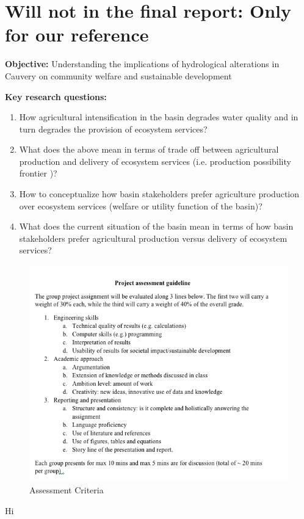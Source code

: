 \section{Will not in the final report: Only for our reference}

\textbf{Objective:} Understanding the implications of hydrological alterations in Cauvery on community welfare and sustainable development

\textbf{Key research questions: }
\begin{enumerate}
    \item How agricultural intensification in the basin degrades water quality and in turn degrades  the provision of ecosystem services?
    \item What does the above mean in terms of trade off between agricultural production and delivery of ecosystem services (i.e. production possibility frontier )?
    \item How to conceptualize how basin stakeholders prefer agriculture  production over ecosystem services (welfare or utility function of the basin)?
    \item What does the current situation of the basin mean in terms of how basin stakeholders prefer agricultural production versus  delivery of ecosystem services?
    
\end{enumerate}

\begin{figure}[H]
    \centering
    \includegraphics[scale = 0.8]{Not_Used_EXTRA/Assessment.png}
    \caption{Assessment Criteria}
    \label{fig:AC}
\end{figure}

Hi 